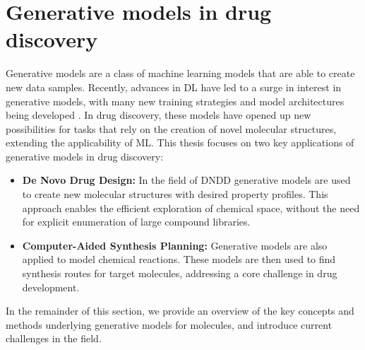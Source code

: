 \section{Generative models in drug discovery}
Generative models are a class of machine learning models that are able to create new data samples.
Recently, advances in \ac{DL} have led to a surge in interest in generative models, with many new
training strategies and model architectures being developed
\citep{bond-taylorDeepGenerativeModelling2022,brownLanguageModelsAre2020,goodfellowGenerativeAdversarialNetworks2014,
    dinhDensityEstimationUsing2017,kingmaAutoEncodingVariationalBayes2013,hoDenoisingDiffusionProbabilistic2020,vaswaniAttentionAllYou2017}.
In drug discovery, these models have opened up new possibilities for tasks that rely on the creation
of novel molecular structures, extending the applicability of \ac{ML}. This thesis focuses on two
key applications of generative models in drug discovery:
\begin{itemize}
    \item \textbf{De Novo Drug Design:} In the field of \ac{DNDD} \citep{schneiderNovoMolecularDesign2013} generative models are used to
          create new molecular structures with desired property profiles. This approach enables
          the efficient exploration of chemical space, without the need for explicit enumeration
          of large compound libraries.
    \item \textbf{Computer-Aided Synthesis Planning:} Generative models are also applied to model
          chemical reactions. These models are then used to find synthesis routes for target
          molecules, addressing a core challenge in drug development.
\end{itemize}

In the remainder of this section, we provide an overview of the key concepts and methods underlying
generative models for molecules, and introduce current challenges in the field.

